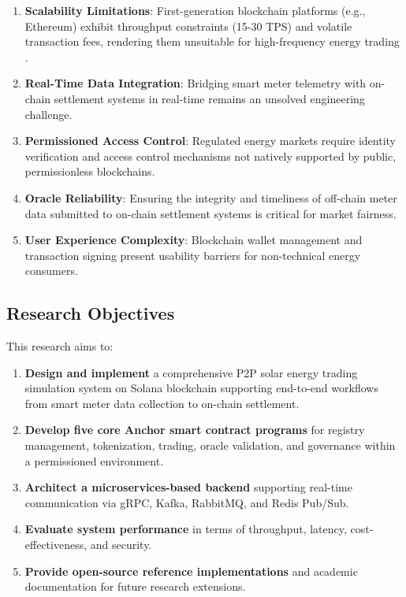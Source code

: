 \documentclass[conference]{IEEEtran}
\begin{document}
\begin{enumerate}
    \item \textbf{Scalability Limitations}: First-generation blockchain platforms (e.g., Ethereum) exhibit throughput constraints (15-30 TPS) and volatile transaction fees, rendering them unsuitable for high-frequency energy trading \cite{buterin2014}.
    \item \textbf{Real-Time Data Integration}: Bridging smart meter telemetry with on-chain settlement systems in real-time remains an unsolved engineering challenge.
    \item \textbf{Permissioned Access Control}: Regulated energy markets require identity verification and access control mechanisms not natively supported by public, permissionless blockchains.
    \item \textbf{Oracle Reliability}: Ensuring the integrity and timeliness of off-chain meter data submitted to on-chain settlement systems is critical for market fairness.
    \item \textbf{User Experience Complexity}: Blockchain wallet management and transaction signing present usability barriers for non-technical energy consumers.
\end{enumerate}

\subsection{Research Objectives}

This research aims to:

\begin{enumerate}
    \item \textbf{Design and implement} a comprehensive P2P solar energy trading simulation system on Solana blockchain supporting end-to-end workflows from smart meter data collection to on-chain settlement.
    \item \textbf{Develop five core Anchor smart contract programs} for registry management, tokenization, trading, oracle validation, and governance within a permissioned environment.
    \item \textbf{Architect a microservices-based backend} supporting real-time communication via gRPC, Kafka, RabbitMQ, and Redis Pub/Sub.
    \item \textbf{Evaluate system performance} in terms of throughput, latency, cost-effectiveness, and security.
    \item \textbf{Provide open-source reference implementations} and academic documentation for future research extensions.
\end{enumerate}
\end{document}
